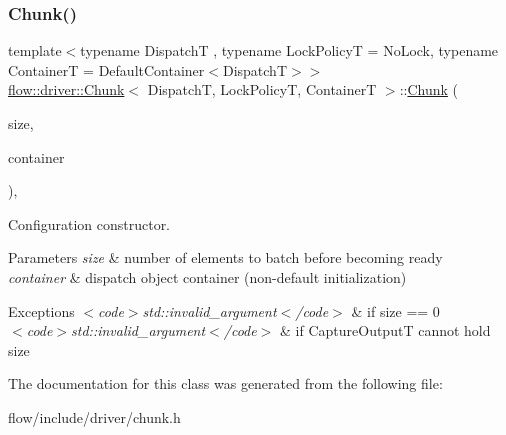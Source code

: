 \subsubsection{\texorpdfstring{Chunk()}{Chunk()}\hspace{0.1cm}{\footnotesize\ttfamily [2/2]}}
{\footnotesize\ttfamily template$<$typename DispatchT , typename Lock\+PolicyT  = No\+Lock, typename ContainerT  = Default\+Container$<$\+Dispatch\+T$>$$>$ \\
\hyperlink{classflow_1_1driver_1_1_chunk}{flow\+::driver\+::\+Chunk}$<$ DispatchT, Lock\+PolicyT, ContainerT $>$\+::\hyperlink{classflow_1_1driver_1_1_chunk}{Chunk} (\begin{DoxyParamCaption}\item[{const \hyperlink{classflow_1_1driver_1_1_chunk_aeab694f517dab9ae86da3369d5da57b6}{size\+\_\+type}}]{size,  }\item[{const ContainerT \&}]{container }\end{DoxyParamCaption})\hspace{0.3cm}{\ttfamily [explicit]}, {\ttfamily [noexcept]}}



Configuration constructor. 


\begin{DoxyParams}{Parameters}
{\em size} & number of elements to batch before becoming ready \\
\hline
{\em container} & dispatch object container (non-\/default initialization)\\
\hline
\end{DoxyParams}

\begin{DoxyExceptions}{Exceptions}
{\em $<$code$>$std\+::invalid\+\_\+argument$<$/code$>$} & if {\ttfamily size == 0} \\
\hline
{\em $<$code$>$std\+::invalid\+\_\+argument$<$/code$>$} & if {\ttfamily Capture\+OutputT} cannot hold {\ttfamily size} \\
\hline
\end{DoxyExceptions}


The documentation for this class was generated from the following file\+:\begin{DoxyCompactItemize}
\item 
flow/include/driver/chunk.\+h\end{DoxyCompactItemize}
